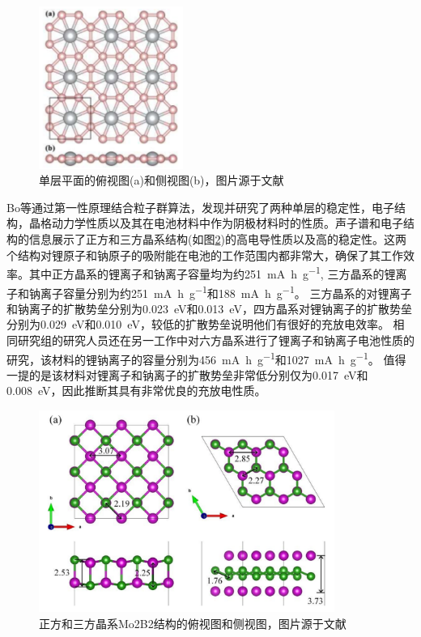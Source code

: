 \begin{figure}[bt]
  \includegraphics[width=0.42\textwidth]{figs/ch1_tib4.png}
  \centering
  \caption{单层平面的俯视图(a)和侧视图(b)，图片源于文献\cite{qu2017two}}
  \label{fig:ch1_tib4}
\end{figure}

Bo等\cite{bo2019tetragonal}通过第一性原理结合粒子群算法，发现并研究了两种单层的稳定性，电子结构，晶格动力学性质以及其在电池材料中作为阴极材料时的性质。声子谱和电子结构的信息展示了正方和三方晶系结构(如图\ref{fig:ch1_mo2b2})的高电导性质以及高的稳定性。这两个结构对锂原子和钠原子的吸附能在电池的工作范围内都非常大，确保了其工作效率。其中正方晶系的锂离子和钠离子容量均为约\SI{251}{\mA\hour\per\g}, 三方晶系的锂离子和钠离子容量分别为约\SI{251}{\mA\hour\per\g}和\SI{188}{\mA\hour\per\g}。
三方晶系的对锂离子和钠离子的扩散势垒分别为\SI{0.023}{\eV}和\SI{0.013}{\eV}，四方晶系对锂钠离子的扩散势垒分别为\SI{0.029}{\eV}和\SI{0.010}{\eV}，较低的扩散势垒说明他们有很好的充放电效率。
相同研究组的研究人员还在另一工作中对六方晶系\cite{bo2018hexagonal}进行了锂离子和钠离子电池性质的研究，该材料的锂钠离子的容量分别为\SI{456}{\mA\hour\per\g}和\SI{1027}{\mA\hour\per\g}。
值得一提的是该材料对锂离子和钠离子的扩散势垒非常低分别仅为\SI{0.017}{\eV}和\SI{0.008}{\eV}，因此推断其具有非常优良的充放电性质。

\begin{figure}[bt]
  \includegraphics[width=0.86\textwidth]{figs/ch1_mo2b2.png}
  \centering
  \caption{正方和三方晶系Mo2B2结构的俯视图和侧视图，图片源于文献\cite{bo2019tetragonal}}
  \label{fig:ch1_mo2b2}
\end{figure}


